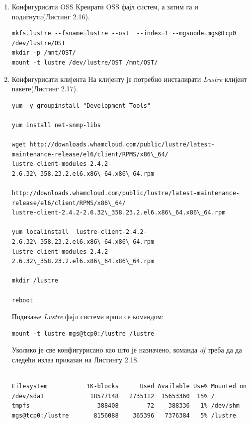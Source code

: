 \begin{enumerate}
\item Конфигурисати OSS 
Креирати OSS фајл систем, а затим га и подигнути(Листинг 2.16).
\begin{lstlisting}[style=nonumbers,frame=single, caption=Креирање OSS фајл систем]
mkfs.lustre --fsname=lustre --ost  --index=1 --mgsnode=mgs@tcp0 /dev/lustre/OST 
mkdir -p /mnt/OST/
mount -t lustre /dev/lustre/OST /mnt/OST/ 
\end{lstlisting}


\item Конфигурисати клијента 
На клијенту је потребно инсталирати \textit{Lustre} клијент пакете(Листинг 2.17). 
\begin{lstlisting}[style=nonumbers,frame=single, caption= Команде за инсталацију \textit{Lustre} клијент пакета]
yum -y groupinstall "Development Tools"

yum install net-snmp-libs

wget http://downloads.whamcloud.com/public/lustre/latest-maintenance-release/el6/client/RPMS/x86\_64/
lustre-client-modules-2.4.2-2.6.32\_358.23.2.el6.x86\_64.x86\_64.rpm

http://downloads.whamcloud.com/public/lustre/latest-maintenance-release/el6/client/RPMS/x86\_64/
lustre-client-2.4.2-2.6.32\_358.23.2.el6.x86\_64.x86\_64.rpm

yum localinstall  lustre-client-2.4.2-2.6.32\_358.23.2.el6.x86\_64.x86\_64.rpm 
lustre-client-modules-2.4.2-2.6.32\_358.23.2.el6.x86\_64.x86\_64.rpm 

mkdir /lustre

reboot
\end{lstlisting}


Подизање   \textit{Lustre} фајл система врши се командом:
\begin{verbatim}
mount -t lustre mgs@tcp0:/lustre /lustre
\end{verbatim}

Уколико је све конфигурисано као што је назначено, команда  \textit{df} треба да да следећи излаз приказан на Листингу 2.18.
\begin{lstlisting}[style=nonumbers,frame=single, caption= Излаз команде \textit{df}]

Filesystem           1K-blocks      Used Available Use% Mounted on
/dev/sda1             18577148   2735112  15653360  15% /
tmpfs                   388408        72    388336   1% /dev/shm
mgs@tcp0:/lustre       8156088    365396   7376384   5% /lustre

\end{lstlisting}

\end{enumerate}


